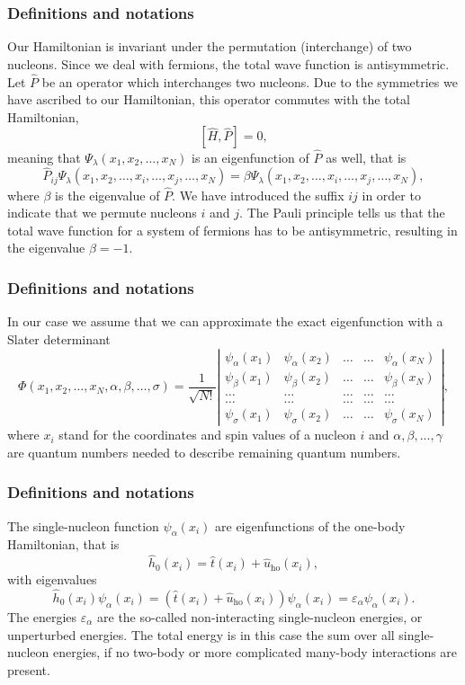\documentclass[compress]{beamer}
\newcommand{\be}{\begin{equation}}
\newcommand{\ee}{\end{equation}}
\begin{document}
\frame
{
  \frametitle{Definitions and notations}
\begin{small}
{\scriptsize
Our Hamiltonian is invariant under the permutation (interchange) of two nucleons. %
Since we deal with fermions, the total wave function is antisymmetric.
Let $\hat{P}$ be an operator which interchanges two nucleons.
Due to the symmetries we have ascribed to our Hamiltonian, this operator commutes with the total Hamiltonian,
\[
[\hat{H},\hat{P}] = 0,
\]
meaning that $\Psi_{\lambda}(x_1, x_2, \dots , x_N)$ is an eigenfunction of 
$\hat{P}$ as well, that is
\[
\hat{P}_{ij}\Psi_{\lambda}(x_1, x_2, \dots,x_i,\dots,x_j,\dots,x_N)=
\beta\Psi_{\lambda}(x_1, x_2, \dots,x_i,\dots,x_j,\dots,x_N),
\]
where $\beta$ is the eigenvalue of $\hat{P}$. We have introduced the suffix $ij$ in order to indicate that we permute nucleons $i$ and $j$.
The Pauli principle tells us that the total wave function for a system of fermions
has to be antisymmetric, resulting in the eigenvalue $\beta = -1$.   
}
\end{small}
}

\frame
{
  \frametitle{Definitions and notations}
\begin{small}
{\scriptsize
In our case we assume that  we can approximate the exact eigenfunction with a Slater determinant
\be
   \Phi(x_1, x_2,\dots ,x_N,\alpha,\beta,\dots, \sigma)=\frac{1}{\sqrt{N!}}
\left| \begin{array}{ccccc} \psi_{\alpha}(x_1)& \psi_{\alpha}(x_2)& \dots & \dots & \psi_{\alpha}(x_N)\\
                            \psi_{\beta}(x_1)&\psi_{\beta}(x_2)& \dots & \dots & \psi_{\beta}(x_N)\\  
                            \dots & \dots & \dots & \dots & \dots \\
                            \dots & \dots & \dots & \dots & \dots \\
                     \psi_{\sigma}(x_1)&\psi_{\sigma}(x_2)& \dots & \dots & \psi_{\sigma}(x_N)\end{array} \right|, 
\label{HartreeFockDet}
\ee 
where  $x_i$  stand for the coordinates and spin values of a nucleon $i$ and $\alpha,\beta,\dots, \gamma$ 
are quantum numbers needed to describe remaining quantum numbers.  
}
\end{small}
}

\frame
{
  \frametitle{Definitions and notations}
\begin{small}
{\scriptsize
The single-nucleon function $\psi_{\alpha}(x_i)$  are eigenfunctions of the one-body
Hamiltonian, that is
\[
\hat{h}_0(x_i)=\hat{t}(x_i) + \hat{u}_{\mathrm{ho}}(x_i),
\]
with eigenvalues 
\[
\hat{h}_0(x_i) \psi_{\alpha}(x_i)=\left(\hat{t}(x_i) + \hat{u}_{\mathrm{ho}}(x_i)\right)\psi_{\alpha}(x_i)=\varepsilon_{\alpha}\psi_{\alpha}(x_i).
\]
The energies $\varepsilon_{\alpha}$ are the so-called non-interacting single-nucleon energies, or unperturbed energies. 
The total energy is in this case the sum over all  single-nucleon energies, if no two-body or more complicated
many-body interactions are present.
}
\end{small}
}
\end{document}
